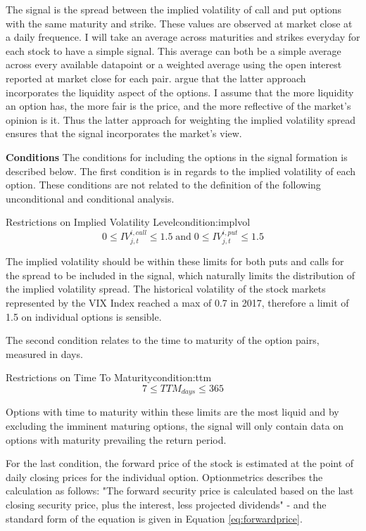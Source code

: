 The signal is the spread between the implied volatility of call and put options with the same maturity and strike. These values are observed at market close at a daily frequence. I will take an average across maturities and strikes everyday for each stock to have a simple signal. This average can both be a simple average across every available datapoint or a weighted average using the open interest reported at market close for each pair. \cite{cremers2010deviations} argue that the latter approach incorporates the liquidity aspect of the options. I assume that the more liquidity an option has, the more fair is the price, and the more reflective of the market's opinion is it. Thus the latter approach for weighting the implied volatility spread ensures that the signal incorporates the market's view.

\textbf{Conditions} The conditions for including the options in the signal formation is described below. The first condition is in regards to the implied volatility of each option. These conditions are not related to the definition of the following unconditional and conditional analysis. 

\begin{mycondition}{Restrictions on Implied Volatility Level}{condition:implvol}
	$$ 0 \leq IV_{j,t}^{i,call} \leq 1.5\; \text{and} \; 0 \leq IV_{j,t}^{i,put} \leq 1.5 $$
	
	The implied volatility should be within these limits for both puts and calls for the spread to be included in the signal, which naturally limits the distribution of the implied volatility spread.
	The historical volatility of the stock markets represented by the VIX Index reached a max of 0.7 in 2017, therefore a limit of 1.5 on individual options is sensible. 
\end{mycondition}

The second condition relates to the time to maturity of the option pairs, measured in days.

\begin{mycondition}{Restrictions on Time To Maturity}{condition:ttm} 
	$$7 \leq TTM_{days}  \leq 365 $$
	
	Options with time to maturity within these limits are the most liquid and by excluding the imminent maturing options, the signal will only contain data on options with maturity prevailing the return period.
\end{mycondition}

For the last condition, the forward price of the stock is estimated at the point of daily closing prices for the individual option. Optionmetrics describes the calculation as follows: "The forward security price is calculated based on the last closing security price, plus the interest, less projected dividends" - \cite{optionmetrics} and the standard form of the equation is given in Equation \ref{eq:forwardprice}.

